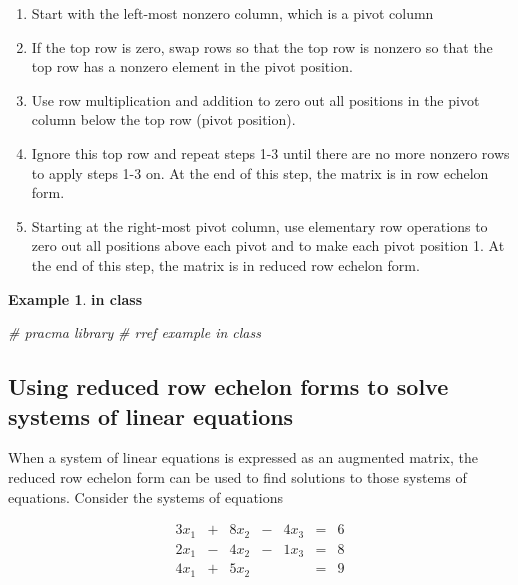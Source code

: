 \documentclass[
]{book}
\newenvironment{Shaded}{\begin{snugshade}}{\end{snugshade}}
\newcommand{\CommentTok}[1]{\textcolor[rgb]{0.56,0.35,0.01}{\textit{#1}}}
\providecommand{\tightlist}{%
  \setlength{\itemsep}{0pt}\setlength{\parskip}{0pt}}
\theoremstyle{definition}
\theoremstyle{definition}
\newtheorem{example}{Example}[chapter]
\theoremstyle{definition}
\theoremstyle{definition}
\theoremstyle{remark}
\begin{document}
\begin{enumerate}
\def\labelenumi{\arabic{enumi})}
\tightlist
\item
  Start with the left-most nonzero column, which is a pivot column
\item
  If the top row is zero, swap rows so that the top row is nonzero so that the top row has a nonzero element in the pivot position.
\item
  Use row multiplication and addition to zero out all positions in the pivot column below the top row (pivot position).
\item
  Ignore this top row and repeat steps 1-3 until there are no more nonzero rows to apply steps 1-3 on. At the end of this step, the matrix is in row echelon form.
\item
  Starting at the right-most pivot column, use elementary row operations to zero out all positions above each pivot and to make each pivot position 1. At the end of this step, the matrix is in reduced row echelon form.
\end{enumerate}

\begin{example}
\textbf{in class}
\end{example}

\begin{Shaded}
\begin{Highlighting}[]
\CommentTok{# pracma library}
\CommentTok{# rref example in class}
\end{Highlighting}
\end{Shaded}

\hypertarget{using-reduced-row-echelon-forms-to-solve-systems-of-linear-equations}{%
\subsection{Using reduced row echelon forms to solve systems of linear equations}\label{using-reduced-row-echelon-forms-to-solve-systems-of-linear-equations}}

When a system of linear equations is expressed as an augmented matrix, the reduced row echelon form can be used to find solutions to those systems of equations. Consider the systems of equations

\[
\begin{alignedat}{4}  3 x_1 & {}+{} & 8 x_2 & {}-{} & 4 x_3 & {}={} & 6\\ 2 x_1 & {}-{} & 4 x_2 & {}-{} & 1 x_3 & {}={} & 8\\ 4 x_1 & {}+{} & 5 x_2 & {}{} &   & {}={} & 9 \end{alignedat}
\]
\end{document}
